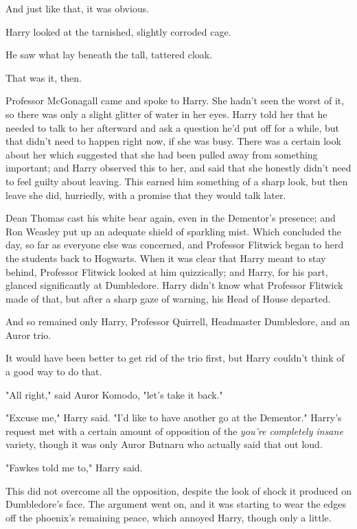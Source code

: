 And just like that, it was obvious.

Harry looked at the tarnished, slightly corroded cage.

He saw what lay beneath the tall, tattered cloak.

That was it, then.

Professor McGonagall came and spoke to Harry. She hadn't seen the worst of it, 
so there was only a slight glitter of water in her eyes. Harry told her that he 
needed to talk to her afterward and ask a question he'd put off for a while, 
but that didn't need to happen right now, if she was busy. There was a certain 
look about her which suggested that she had been pulled away from something 
important; and Harry observed this to her, and said that she honestly didn't 
need to feel guilty about leaving. This earned him something of a sharp look, 
but then leave she did, hurriedly, with a promise that they would talk later.

Dean Thomas cast his white bear again, even in the Dementor's presence; and Ron 
Weasley put up an adequate shield of sparkling mist. Which concluded the day, 
so far as everyone else was concerned, and Professor Flitwick began to herd the 
students back to Hogwarts. When it was clear that Harry meant to stay behind, 
Professor Flitwick looked at him quizzically; and Harry, for his part, glanced 
significantly at Dumbledore. Harry didn't know what Professor Flitwick made of 
that, but after a sharp gaze of warning, his Head of House departed.

And so remained only Harry, Professor Quirrell, Headmaster Dumbledore, and an 
Auror trio.

It would have been better to get rid of the trio first, but Harry couldn't 
think of a good way to do that.

"All right," said Auror Komodo, "let's take it back."

"Excuse me," Harry said. "I'd like to have another go at the Dementor."
\sbreak
Harry's request met with a certain amount of opposition of the \emph{you're 
completely insane} variety, though it was only Auror Butnaru who actually said 
that out loud.

"Fawkes told me to," Harry said.

This did not overcome all the opposition, despite the look of shock it produced 
on Dumbledore's face. The argument went on, and it was starting to wear the 
edges off the phoenix's remaining peace, which annoyed Harry, though only a 
little.

